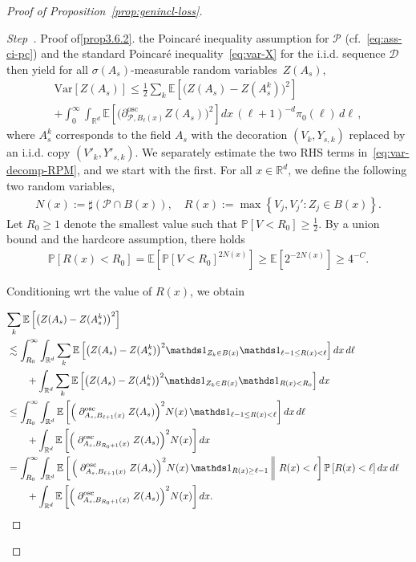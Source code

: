 \documentclass[10pt]{amsart}
\theoremstyle{definition}\newtheorem{defi}[theo]{Definition}\newtheorem{rema}[theo]{Remark}\newtheorem{exam}[theo]{Example}\newtheorem{exem}[theo]{Example}\newtheorem{nota}[theo]{Notation}
\newcommand{\R}{\mathbb R}
\newcommand{\expec}[1]{\mathbb{E}\left[#1 \right]}
\newcommand{\pr}[1]{\mathbb{P}\left[#1 \right]}
\newcommand{\expeC}[2]{\mathbb{E}\left[\left. #1 \,\right\|\,#2\right]}
\newcommand{\Pc}{\mathcal P}
\newcommand{\Dc}{\mathcal D}
\newcommand{\osc}{\partial^{\mathrm{osc}}}
\newcommand{\oscd}[1]{\mathrel{\osc_{#1}}}
\newcommand{\var}[1]{\mathrm{Var}\left[#1\right]}
\newcounter{stepcount}
\newenvironment{step}{\refstepcounter{stepcount}\begin{proof}[Step~\thestepcount]}{\let\qed\relax\end{proof}}
\begin{document}
\begin{proof}[Proof of Proposition~\ref{prop:genincl-loss}]
\begin{step}{Proof of\eqref{prop3.6.2}.}
\goodbreak
\noindent the Poincaré inequality assumption for $\Pc$ (cf.~\eqref{eq:ass-ci-pc}) and the standard Poincaré inequality~\eqref{eq:var-X} for the i.i.d. sequence $\Dc$ then yield for all $\sigma(A_s)$-measurable random variables~$Z(A_s)$,
\begin{multline}\label{eq:var-decomp-RPM}
\var{Z(A_s)}\le \frac12\sum_{k}\expec{\big(Z(A_s)-Z(A_s^k)\big)^2}\\
+\int_0^\infty\int_{\R^d}\expec{\Big(\oscd{\Pc,B_{\ell}(x)}Z(A_s)\Big)^2}dx\,(\ell+1)^{-d}\pi_0(\ell)\,d\ell\,,
\end{multline}
where $A^k_s$ corresponds to the field $A_s$ with the decoration $(V_k,Y_{s,k})$ replaced by an i.i.d. copy $(V'_k,Y'_{s,k})$. We separately estimate the two RHS terms in~\eqref{eq:var-decomp-RPM}, and we start with the first. For all $x\in\R^d$, we define the following two random variables,
\begin{align*}
N(x):=\sharp(\Pc\cap B(x)),\quad R(x):=\max\left\{V_j,V_j':Z_j\in B(x)\right\}.
\end{align*}
Let $R_0\ge1$ denote the smallest value such that $\pr{V<R_0}\ge\frac12$. By a union bound and the hardcore assumption, there holds
\begin{align}\label{eq:choice-R0-SGRPM}
\pr{R(x)<R_0}=\expec{\pr{V<R_0}^{2N(x)}}\ge \expec{2^{-2N(x)}}\ge 4^{-C}.
\end{align}


Conditioning wrt the value of $R(x)$, we obtain


\begin{align*}
\lefteqn{\sum_{k}\expec{\big(Z(A_s)-Z(A_s^k)\big)^2}}\\
&\lesssim\int_{R_0}^\infty\int_{\R^d}\sum_{k}\expec{\big(Z(A_s)-Z(A_s^k)\big)^2\mathds1_{Z_k\in B(x)}\mathds1_{\ell-1\le R(x)<\ell}}dx\,d\ell\\
&\qquad+\int_{\R^d}\sum_{k}\expec{\big(Z(A_s)-Z(A_s^k)\big)^2\mathds1_{Z_k\in B(x)}\mathds1_{R(x)<R_0}}dx\\
&\le\int_{R_0}^\infty\int_{\R^d}\expec{\Big(\oscd{A_s,B_{\ell+1}(x)}Z(A_s)\Big)^2N(x)\,\mathds1_{\ell-1\le R(x)<\ell}}dx\,d\ell\\
&\qquad+\int_{\R^d}\expec{\Big(\oscd{A_s,B_{R_0+1}(x)}Z(A_s)\Big)^2N(x)}dx\\
&=\int_{R_0}^\infty\int_{\R^d}\expeC{\Big(\oscd{A_s,B_{\ell+1}(x)}Z(A_s)\Big)^2N(x)\,\mathds1_{R(x)\ge\ell-1}}{R(x)<\ell}\pr{R(x)<\ell}dx\,d\ell\\
&\qquad+\int_{\R^d}\expec{\Big(\oscd{A_s,B_{R_0+1}(x)}Z(A_s)\Big)^2N(x)}dx.
\end{align*}


\end{step}
\end{proof}
\end{document}
